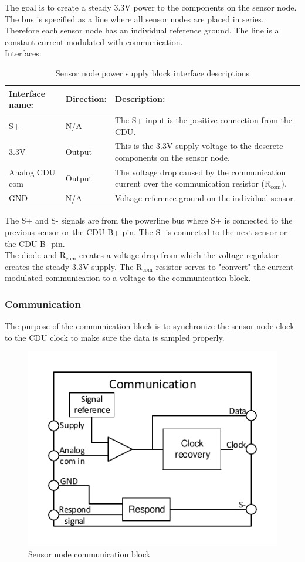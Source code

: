 The goal is to create a steady 3.3V power to the components on the sensor node. The bus is specified as a line where all sensor nodes are placed in series. Therefore each sensor node has an individual reference ground. The line is a constant current modulated with communication.\\
Interfaces:
\begin{table}[H]
	\centering
	\begin{tabular}{|p{3cm} |p{2cm} | p{8cm}| }
		\hline
		Interface name:	& Direction: 		& Description: \\ \hline
		S+ 				& N/A				& The S+ input is the positive connection from the CDU. \\ \hline
		3.3V			& Output			& This is the 3.3V supply voltage to the descrete components on the sensor node. \\ 	\hline
		Analog CDU com  & Output			& The voltage drop caused by the communication current over the communication resistor (R$_{\text{com}}$).\\ \hline
		GND				& N/A				& Voltage reference ground on the individual sensor.\\\hline 
	\end{tabular}
	\caption{Sensor node power supply block interface descriptions}
\end{table}

The S+ and S- signals are from the powerline bus where S+ is connected to the previous sensor or the CDU B+ pin. The S- is connected to the next sensor or the CDU B- pin.\\

The diode and R$_{\text{com}}$ creates a voltage drop from which the voltage regulator creates the steady 3.3V supply. The R$_{\text{com}}$ resistor serves to "convert" the current modulated communication to a voltage to the communication block.

\subsubsection{Communication}

The purpose of the communication block is to synchronize the sensor node clock to the CDU clock to make sure the data is sampled properly.

\begin{figure}[H]
	\centering
	\includegraphics[width=.5\textwidth]{billeder/communication_sn}
	\caption{Sensor node communication block}
	\label{fig:SN_com_fig}
\end{figure}

